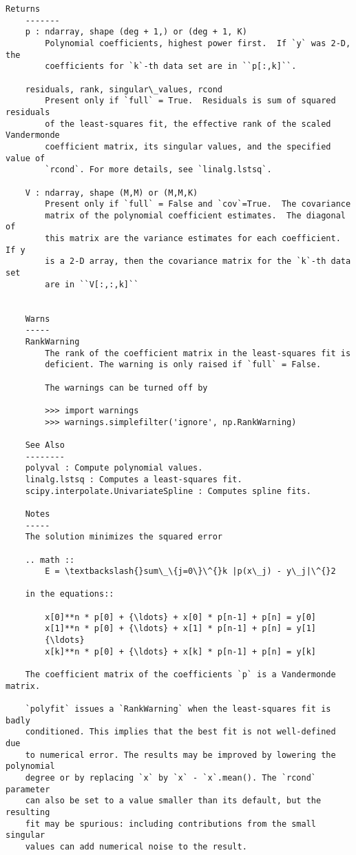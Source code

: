 \documentclass[11pt]{article}
\begin{document}
\begin{Verbatim}[commandchars=\\\{\}]
    Returns
    -------
    p : ndarray, shape (deg + 1,) or (deg + 1, K)
        Polynomial coefficients, highest power first.  If `y` was 2-D, the
        coefficients for `k`-th data set are in ``p[:,k]``.

    residuals, rank, singular\_values, rcond
        Present only if `full` = True.  Residuals is sum of squared residuals
        of the least-squares fit, the effective rank of the scaled Vandermonde
        coefficient matrix, its singular values, and the specified value of
        `rcond`. For more details, see `linalg.lstsq`.

    V : ndarray, shape (M,M) or (M,M,K)
        Present only if `full` = False and `cov`=True.  The covariance
        matrix of the polynomial coefficient estimates.  The diagonal of
        this matrix are the variance estimates for each coefficient.  If y
        is a 2-D array, then the covariance matrix for the `k`-th data set
        are in ``V[:,:,k]``


    Warns
    -----
    RankWarning
        The rank of the coefficient matrix in the least-squares fit is
        deficient. The warning is only raised if `full` = False.

        The warnings can be turned off by

        >>> import warnings
        >>> warnings.simplefilter('ignore', np.RankWarning)

    See Also
    --------
    polyval : Compute polynomial values.
    linalg.lstsq : Computes a least-squares fit.
    scipy.interpolate.UnivariateSpline : Computes spline fits.

    Notes
    -----
    The solution minimizes the squared error

    .. math ::
        E = \textbackslash{}sum\_\{j=0\}\^{}k |p(x\_j) - y\_j|\^{}2

    in the equations::

        x[0]**n * p[0] + {\ldots} + x[0] * p[n-1] + p[n] = y[0]
        x[1]**n * p[0] + {\ldots} + x[1] * p[n-1] + p[n] = y[1]
        {\ldots}
        x[k]**n * p[0] + {\ldots} + x[k] * p[n-1] + p[n] = y[k]

    The coefficient matrix of the coefficients `p` is a Vandermonde matrix.

    `polyfit` issues a `RankWarning` when the least-squares fit is badly
    conditioned. This implies that the best fit is not well-defined due
    to numerical error. The results may be improved by lowering the polynomial
    degree or by replacing `x` by `x` - `x`.mean(). The `rcond` parameter
    can also be set to a value smaller than its default, but the resulting
    fit may be spurious: including contributions from the small singular
    values can add numerical noise to the result.


\end{Verbatim}
\end{document}
